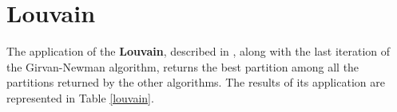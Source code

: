     \begin{table}[H]
        \centering
        \begin{subtable}{\textwidth}
        \end{subtable}
        \caption{Evaluation of the partition obtained by the application of the Label Propagaion algorithm.}
        \label{labelprop}
    \end{table}


\section{Louvain} %
\label{sec:louvain}
    The application of the \textbf{Louvain}, described in \cite{louvain}, along with the last iteration of the
    Girvan-Newman algorithm, returns the best partition among all the partitions returned by the other algorithms.
    The results of its application are represented in Table \ref{louvain}.

    \begin{table}[H]
        \centering
        \begin{subtable}{\textwidth}
        \end{subtable}
        \caption{Evaluation of the partition obtained by the application of the Louvain algorithm.}
        \label{louvain}
    \end{table}

